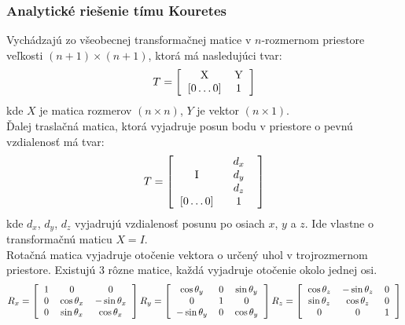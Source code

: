 \subsubsection{Analytické riešenie tímu Kouretes}
Vychádzajú zo všeobecnej transformačnej matice v $n$-rozmernom priestore veľkosti $(n+1)\times (n+1)$, ktorá má nasledujúci tvar:
\begin{equation}
	T = \left[
	\begin{tabular}{cc}
		X & Y \\
		$[0\ldots0]$ & 1
	\end{tabular}
	\right]
\end{equation}
kde $X$ je matica rozmerov $(n\times n)$, $Y$ je vektor $(n \times 1)$.
\\
Ďalej traslačná matica, ktorá vyjadruje posun bodu v priestore o pevnú vzdialenosť má tvar:
\begin{equation}
	T = \left[
	\begin{tabular}{cc}
		I & 
			\begin{tabular}{c}
				$d_x$ \\
				$d_y$ \\
				$d_z$
			\end{tabular}
			 \\
		$[0\ldots0]$ & 1
	\end{tabular}
	\right]
\end{equation}
kde $d_x$, $d_y$, $d_z$ vyjadrujú vzdialenosť posunu po osiach $x$, $y$ a $z$. Ide vlastne o transformačnú maticu $X=I$.
\\
Rotačná matica vyjadruje otočenie  vektora o určený uhol v trojrozmernom priestore. Existujú 3 rôzne matice, každá vyjadruje otočenie okolo jednej osi.
\begin{equation}
	R_x = \left[
	\begin{tabular}{ccc}
	 1 & 0 & 0 \\
	 0 & $\cos\theta_x$ & $-\sin\theta_x$ \\
	 0 & $\sin\theta_x$ & $\cos\theta_x$
	\end{tabular}
	\right]	
	R_y = \left[
	\begin{tabular}{ccc}
	 $\cos\theta_y$ & 0 & $\sin\theta_y$ \\
	 0 & 1 & 0 \\
	 $-\sin\theta_y$ & 0 & $\cos\theta_y$
	\end{tabular}
	\right]
	R_z = \left[
	\begin{tabular}{ccc}
	 $\cos\theta_z$ & $-\sin\theta_z$ & 0 \\
	 $\sin\theta_z$ & $\cos\theta_z$ & 0 \\
	 0 & 0 & 1
	\end{tabular}
	\right]
\end{equation}

